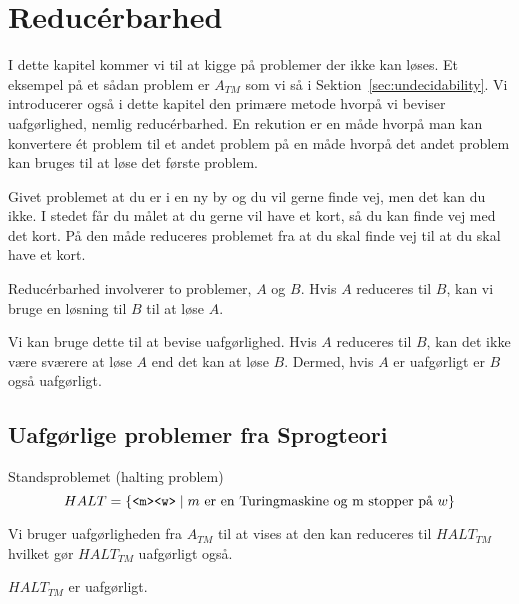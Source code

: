 \chapter{Reducérbarhed}

I dette kapitel kommer vi til at kigge på problemer der ikke kan løses. Et eksempel på et sådan problem er $A_{TM}$ som vi så i Sektion~\ref{sec:undecidability}. Vi introducerer også i dette kapitel den primære metode hvorpå vi beviser uafgørlighed, nemlig reducérbarhed. En rekution er en måde hvorpå man kan konvertere ét problem til et andet problem på en måde hvorpå det andet problem kan bruges til at løse det første problem.

Givet problemet at du er i en ny by og du vil gerne finde vej, men det kan du ikke. I stedet får du målet at du gerne vil have et kort, så du kan finde vej med det kort. På den måde reduceres problemet fra at du skal finde vej til at du skal have et kort.

Reducérbarhed involverer to problemer, $A$ og $B$. Hvis $A$ reduceres til $B$, kan vi bruge en løsning til $B$ til at løse $A$.

Vi kan bruge dette til at bevise uafgørlighed. Hvis $A$ reduceres til $B$, kan det ikke være sværere at løse $A$ end det kan at løse $B$. Dermed, hvis $A$ er uafgørligt er $B$ også uafgørligt.

\section{Uafgørlige problemer fra Sprogteori}%
\label{sec:uafgørligsprogteri}

Standsproblemet (halting problem) $$HALT = \{\text{\texttt{<m><w>}} \mid m \text{ er en Turingmaskine og m stopper på }w\}$$

Vi bruger uafgørligheden fra $A_{TM}$ til at vises at den kan reduceres til $HALT_{TM}$ hvilket gør $HALT_{TM}$ uafgørligt også.

\begin{theorem}
	$HALT_{TM}$ er uafgørligt.
\end{theorem}

